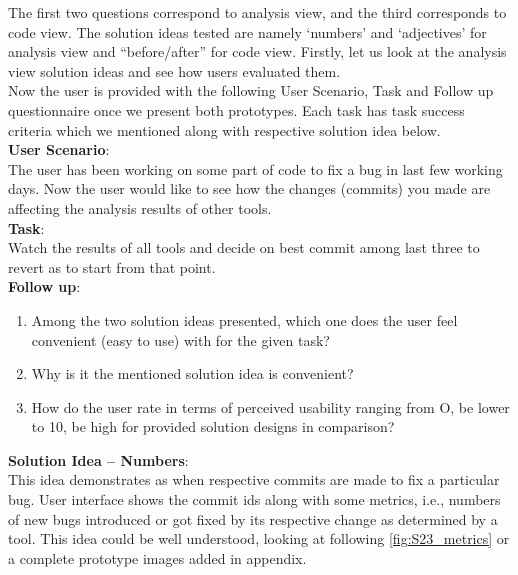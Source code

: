 The first two questions correspond to analysis view, and the third corresponds to code view. The solution ideas tested are namely ‘numbers’ and ‘adjectives’ for analysis view and “before/after” for code view. Firstly, let us look at the analysis view solution ideas and see how users evaluated them. \\

Now the user is provided with the following User Scenario, Task and Follow up questionnaire once we present both prototypes. Each task has task success criteria which we mentioned along with respective solution idea below. \\


\textbf{User Scenario}: \\

The user has been working on some part of code to fix a bug in last few working days. Now the user would like to see how the changes (commits) you made are affecting the analysis results of other tools. \\

\textbf{Task}: \\

Watch the results of all tools and decide on best commit among last three to revert as to start from that point. \\

\textbf{Follow up}: \\

\begin{enumerate}
\item Among the two solution ideas presented, which one does the user feel convenient (easy to use) with for the given task?
\item Why is it the mentioned solution idea is convenient?
\item How do the user rate in terms of perceived usability ranging from O, be lower to 10, be high for provided solution designs in comparison?
\end{enumerate}

\textbf{Solution Idea – Numbers}: \\

This idea demonstrates as when respective commits are made to fix a particular bug. User interface shows the commit ids along with some metrics, i.e., numbers of new bugs introduced or got fixed by its respective change as determined by a tool. This idea could be well understood, looking at following \autoref{fig:S23_metrics} or a complete prototype images added in appendix. \\


